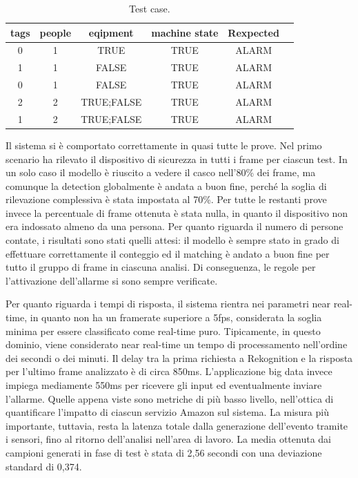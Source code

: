 \begin{table}[htbp]
\centering
\begin{tabular}{|c|c|c|c|c|c|}
\toprule
\textbf{tags} & \textbf{people} & \textbf{eqipment} & \textbf{machine state} & \textbf{Rexpected} \\ \midrule

 0 & 1 & TRUE & TRUE & ALARM  \\ \midrule
 1 & 1 & FALSE & TRUE & ALARM     \\ \midrule
 0 & 1 & FALSE & TRUE & ALARM    \\ \midrule
 2 & 2 & TRUE;FALSE & TRUE & ALARM    \\ \midrule
 1 & 2 & TRUE;FALSE & TRUE & ALARM    \\ \midrule
\end{tabular}
\caption{Test case.}
\label{tab:test-cases}
\end{table}

Il sistema si è comportato correttamente in quasi tutte le prove. Nel primo scenario ha rilevato il dispositivo di sicurezza in tutti i frame per ciascun test. In un solo caso il modello è riuscito a vedere il casco nell'80\% dei frame, ma comunque la detection globalmente è andata a buon fine, perché la soglia di rilevazione complessiva è stata impostata al 70\%. Per tutte le restanti prove invece la percentuale di frame ottenuta è stata nulla, in quanto il dispositivo non era indossato almeno da una persona. Per quanto riguarda il numero di persone contate, i risultati sono stati quelli attesi: il modello è sempre stato in grado di effettuare correttamente il conteggio ed il matching è andato a buon fine per tutto il gruppo di frame in ciascuna analisi. Di conseguenza, le regole per l'attivazione dell'allarme si sono sempre verificate.

Per quanto riguarda i tempi di risposta, il sistema rientra nei parametri near real-time, in quanto non ha un framerate superiore a 5fps, considerata la soglia minima per essere classificato come real-time puro. Tipicamente, in questo dominio, viene considerato near real-time un tempo di processamento nell'ordine dei secondi o dei minuti. Il delay tra la prima richiesta a Rekognition e la risposta per l'ultimo frame analizzato è di circa 850ms. L'applicazione big data invece impiega mediamente 550ms per ricevere gli input ed eventualmente inviare l'allarme. Quelle appena viste sono metriche di più basso livello, nell'ottica di quantificare l'impatto di ciascun servizio Amazon sul sistema. La misura più importante, tuttavia, resta la latenza totale dalla generazione dell'evento tramite i sensori, fino al ritorno dell'analisi nell'area di lavoro. La media ottenuta dai campioni generati in fase di test è stata di 2,56 secondi con una deviazione standard di 0,374.


